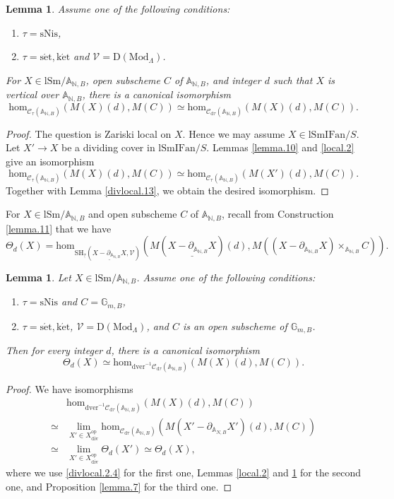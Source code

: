 \documentclass[10pt]{amsart}
\newtheorem{lem}[thm]{Lemma}
\theoremstyle{definition}
\theoremstyle{remark}
\numberwithin{equation}{subsection}
\newcommand{\A}{\mathbb{A}}
\newcommand{\G}{\mathbb{G}}
\newcommand{\N}{\mathbb{N}}
\newcommand{\cV}{\mathcal{V}}
\newcommand{\sC}{\mathscr{C}}
\newcommand{\limit}{\mathop{\mathrm{lim}}}
\newcommand{\ul}{\underline}
\newcommand{\SH}{\mathrm{SH}}
\newcommand{\map}{\mathrm{hom}}
\newcommand{\DLambda}{\mathrm{D}(\mathrm{Mod}_{\Lambda})}
\newcommand{\lSm}{\mathrm{lSm}}
\newcommand{\lSmIFan}{\mathrm{lSmIFan}}
\newcommand{\op}{\mathrm{op}}
\newcommand{\dver}{\mathrm{dver}}
\newcommand{\divi}{\mathrm{div}}
\newcommand{\dtau}{\mathrm{d}\tau}
\newcommand{\sNis}{\mathrm{sNis}}
\newcommand{\ketale}{\mathrm{k\acute{e}t}}
\newcommand{\setale}{\mathrm{s\acute{e}t}}
\begin{document}
\begin{lem}
\label{local.3}
Assume one of the following conditions:
\begin{enumerate}
\item[\textup{(i)}]
$\tau=\sNis$,
\item[\textup{(ii)}]
$\tau=\setale,\ketale$ and $\cV=\DLambda$.
\end{enumerate}
For $X\in \lSm/{\A_{\N,B}}$, open subscheme $C$ of $\A_{\N,B}$, and integer $d$ such that $X$ is vertical over $\A_{\N,B}$,
there is a canonical isomorphism
\[
\map_{\sC_{\tau}(\A_{\N,B})}
(M(X)(d),M(C))
\simeq
\map_{\sC_{\dtau}(\A_{\N,B})}
(M(X)(d),M(C)).
\]
\end{lem}
\begin{proof}
The question is Zariski local on $X$.
Hence we may assume $X\in \lSmIFan/S$.
Let $X'\to X$ be a dividing cover in $\lSmIFan/S$.
Lemmas \ref{lemma.10} and \ref{local.2} give an isomorphism
\[
\map_{\sC_{\tau}(\A_{\N,B})}
(M(X)(d),M(C))
\simeq
\map_{\sC_{\tau}(\A_{\N,B})}
(M(X')(d),M(C)).
\]
Together with Lemma \ref{divlocal.13}, we obtain the desired isomorphism.
\end{proof}



For $X\in \lSm/\A_{\N,B}$ and open subscheme $C$ of $\A_{\N,B}$, recall from Construction \ref{lemma.11} that we have
\[
\Theta_d(X)
=
\map_{\SH_{\ul{\tau}}(\ul{X-\partial_{\A_{\N,B}}X},\cV)}
(M(\ul{X-\partial_{\A_{\N,B}}X})(d),M((X-\partial_{\A_{\N,B}}X)\times_{\A_{\N,B}}C)).
\]




\begin{lem}
\label{local.4}
Let $X\in \lSm/{\A_{\N,B}}$.
Assume one of the following conditions:
\begin{enumerate}
\item[\textup{(i)}]
$\tau=\sNis$ and $C=\G_{m,B}$,
\item[\textup{(ii)}]
$\tau=\setale,\ketale$, $\cV=\DLambda$, and $C$ is an open subscheme of $\G_{m,B}$.
\end{enumerate}
Then for every integer $d$,
there is a canonical isomorphism
\[
\Theta_d(X)
\simeq 
\map_{\dver^{-1}\sC_{\dtau}(\A_{\N,B})}
(M(X)(d),M(C)).
\]
\end{lem}
\begin{proof}
We have isomorphisms
\begin{align*}
& \map_{\dver^{-1}\sC_{\dtau}(\A_{\N,B})}
(M(X)(d),M(C))
\\
\simeq &
\limit_{X'\in X_{\divi}^{\op}} \map_{\sC_{\dtau}(\A_{\N,B})}
(M(X'-\partial_{\A_{N,B}}X')(d),M(C))
\\
\simeq &
\limit_{X'\in X_{\divi}^{\op}}
\Theta_d(X')
\simeq
\Theta_d(X),
\end{align*}
where we use \eqref{divlocal.2.4} for the first one, Lemmas \ref{local.2} and \ref{local.3} for the second one, and Proposition \ref{lemma.7} for the third one.
\end{proof}
\end{document}
